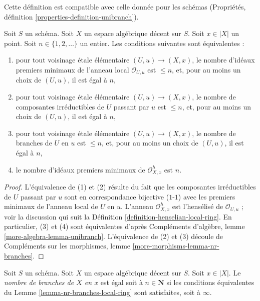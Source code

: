 \noindent
Cette définition est compatible avec celle donnée pour les schémas
(Propriétés, définition \ref{properties-definition-unibranch}).

\begin{lemma}
\label{lemma-nr-branches-local-ring}
Soit $S$ un schéma. Soit $X$ un espace algébrique décent sur $S$.
Soit $x \in |X|$ un point. Soit $n \in \{1, 2, \ldots\}$ un entier.
Les conditions suivantes sont équivalentes :
\begin{enumerate}
\item pour tout voisinage étale élémentaire $(U, u) \to (X, x)$, le nombre
d'idéaux premiers minimaux de l'anneau local $\mathcal{O}_{U, u}$ est
$\leq n$, et, pour au moins un choix de $(U, u)$, il est égal à $n$,
\item pour tout voisinage étale élémentaire $(U, u) \to (X, x)$, le nombre
de composantes irréductibles de $U$ passant par $u$ est $\leq n$, et, pour
au moins un choix de $(U, u)$, il est égal à $n$,
\item pour tout voisinage étale élémentaire $(U, u) \to (X, x)$, le nombre
de branches de $U$ en $u$ est $\leq n$, et, pour au moins un choix de
$(U, u)$, il est égal à $n$,
\item le nombre d'idéaux premiers minimaux de
$\mathcal{O}_{X, x}^h$ est $n$.
\end{enumerate}
\end{lemma}

\begin{proof}
L'équivalence de (1) et (2) résulte du fait que les composantes irréductibles
de $U$ passant par $u$ sont en correspondance bijective ($1$-$1$) avec les
premiers minimaux de l'anneau local de $U$ en $u$.
L'anneau $\mathcal{O}_{X, x}^h$ est l'hensélisé de $\mathcal{O}_{U, u}$ ;
voir la discussion qui suit la
Définition \ref{definition-henselian-local-ring}.
En particulier, (3) et (4) sont équivalentes d'après Compléments d'algèbre,
lemme \ref{more-algebra-lemma-unibranch}.
L'équivalence de (2) et (3) découle de Compléments sur les morphismes, lemme
\ref{more-morphisms-lemma-nr-branches}.
\end{proof}

\begin{definition}
\label{definition-number-of-branches}
Soit $S$ un schéma. Soit $X$ un espace algébrique décent sur $S$.
Soit $x \in |X|$. Le {\it nombre de branches de $X$ en $x$} est égal soit à
$n \in \mathbf{N}$ si les conditions équivalentes du
Lemme \ref{lemma-nr-branches-local-ring} sont satisfaites, soit à $\infty$.
\end{definition}






